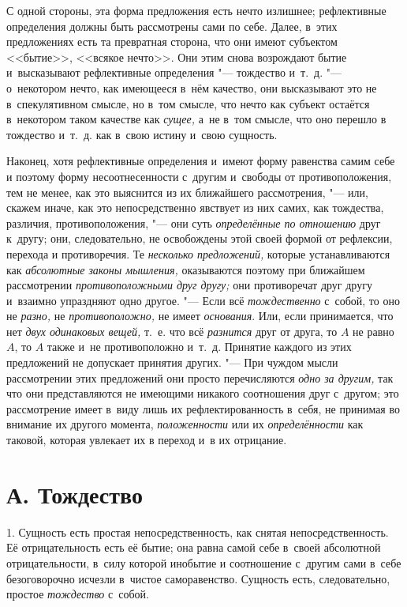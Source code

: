 С одной стороны, эта форма предложения есть нечто излишнее; рефлективные
определения должны быть рассмотрены сами по себе. Далее, в~этих
предложениях есть та превратная сторона, что они имеют субъектом <<бытие>>,
<<всякое нечто>>. Они этим снова возрождают бытие и~высказывают рефлективные
определения "--- тождество и~т.~д. "--- о~некотором нечто, как имеющееся в~нём
качество, они высказывают это не в~спекулятивном смысле, но в~том смысле,
что нечто как субъект остаётся в~некотором таком качестве как
{\em сущее,} а~не в~том смысле, что оно перешло в
тождество и~т.~д. как в~свою истину и~свою сущность.

Наконец, хотя рефлективные определения и~имеют форму равенства самим себе и
поэтому форму несоотнесенности с~другим и~свободы от противоположения, тем
не менее, как это выяснится из их ближайшего рассмотрения, "--- или, скажем
иначе, как это непосредственно явствует из них самих, как тождества,
различия, противоположения, "--- они суть
{\em определённые по отношению} друг к~другу; они,
следовательно, не освобождены этой своей формой от рефлексии, перехода и
противоречия. Те {\em несколько предложений,} которые
устанавливаются как {\em абсолютные законы мышления,}
оказываются поэтому при ближайшем рассмотрении
{\em противоположными друг другу;} они противоречат
друг другу и~взаимно упраздняют одно другое. "--- Если всё
{\em тождественно} с~собой, то оно не {\em разно,} не
{\em противоположно,} не имеет {\em основания}. Или, если принимается, что нет
{\em двух одинаковых вещей,} т.~е. что всё
{\em разнится} друг от друга, то $A$ не равно
$A$, то $A$ также и~не противоположно и~т.~д. Принятие
каждого из этих предложений не допускает принятия других. "--- При чуждом
мысли рассмотрении этих предложений они просто перечисляются
{\em одно за другим,} так что они представляются не
имеющими никакого соотношения друг с~другом; это рассмотрение имеет в~виду
лишь их рефлектированность в~себя, не принимая во внимание их другого
момента, {\em положенности} или их
{\em определённости} как таковой, которая увлекает их в
переход и~в их отрицание.

\section[А. Тождество]{А. Тождество}
1. Сущность есть простая непосредственность, как
снятая непосредственность. Её отрицательность есть её бытие; она равна
самой себе в~своей абсолютной отрицательности, в~силу которой инобытие и
соотношение с~другим сами в~себе безоговорочно исчезли в~чистое
саморавенство. Сущность есть, следовательно, простое
{\em тождество} с~собой.

